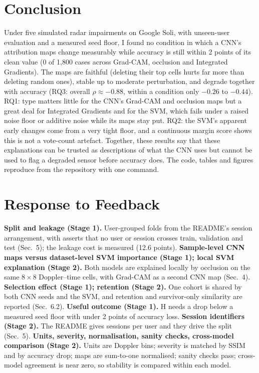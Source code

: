 \documentclass[11pt]{article}
\begin{document}
\section{Conclusion}
Under five simulated radar impairments on Google Soli, with unseen-user evaluation and a measured seed floor, I found no condition in which a CNN's attribution maps change measurably while accuracy is still within 2 points of its clean value (0 of 1{,}800 cases across Grad-CAM, occlusion and Integrated Gradients). The maps are faithful (deleting their top cells hurts far more than deleting random ones), stable up to moderate perturbation, and degrade together with accuracy (RQ3: overall $\rho\approx-0.88$, within a condition only $-0.26$ to $-0.44$). RQ1: type matters little for the CNN's Grad-CAM and occlusion maps but a great deal for Integrated Gradients and for the SVM, which fails under a raised noise floor or additive noise while its maps stay put. RQ2: the SVM's apparent early changes come from a very tight floor, and a continuous margin score shows this is not a vote-count artefact. Together, these results say that these explanations can be trusted as descriptions of what the CNN uses but cannot be used to flag a degraded sensor before accuracy does. The code, tables and figures reproduce from the repository with one command.

\section*{Response to Feedback}
\small
\textbf{Split and leakage (Stage 1).} User-grouped folds from the README's session arrangement, with asserts that no user or session crosses train, validation and test (Sec.~5); the leakage cost is measured (12.6 points). \textbf{Sample-level CNN maps versus dataset-level SVM importance (Stage 1); local SVM explanation (Stage 2).} Both models are explained locally by occlusion on the same $8\times8$ Doppler--time cells, with Grad-CAM as a second CNN map (Sec.~4). \textbf{Selection effect (Stage 1); retention (Stage 2).} One cohort is shared by both CNN seeds and the SVM, and retention and survivor-only similarity are reported (Sec.~6.2). \textbf{Useful outcome (Stage 1).} H needs a drop below a measured seed floor with under 2 points of accuracy loss. \textbf{Session identifiers (Stage 2).} The README gives sessions per user and they drive the split (Sec.~5). \textbf{Units, severity, normalisation, sanity checks, cross-model comparison (Stage 2).} Units are Doppler bins; severity is matched by SSIM and by accuracy drop; maps are sum-to-one normalised; sanity checks pass; cross-model agreement is near zero, so stability is compared within each model.
\end{document}

